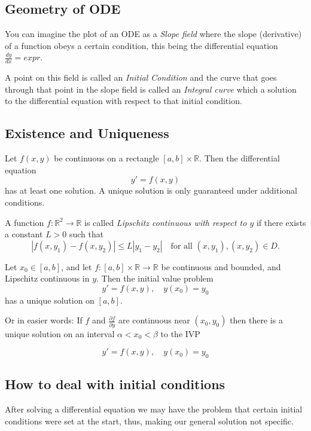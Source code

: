 \subsection{Geometry of ODE}

You can imagine the plot of an ODE as a \emph{Slope field} where the slope (derivative) of a function
obeys a certain condition, this being the differential equation \(\frac{dy}{dx} = expr\).
\vspace{\baselineskip}

A point on this field is called an \emph{Initial Condition} and the curve that goes through
that point in the slope field is called an \emph{Integral curve} which a solution to the differential
equation with respect to that initial condition.


\subsection{Existence and Uniqueness}

Let \( f(x, y) \) be continuous on a rectangle \( [a, b] \times \mathbb{R} \). Then the differential equation
\[
y' = f(x, y)
\]
has at least one solution. A unique solution is only guaranteed under additional conditions.

A function \( f : \mathbb{R}^2 \to \mathbb{R} \) is called \emph{Lipschitz continuous with respect to \( y \)} if there exists a constant \( L > 0 \) such that
\[
|f(x, y_1) - f(x, y_2)| \leq L |y_1 - y_2|
\quad \text{for all } (x, y_1), (x, y_2) \in D.
\]

Let \( x_0 \in [a, b] \), and let \( f : [a, b] \times \mathbb{R} \to \mathbb{R} \) be continuous and bounded, and Lipschitz continuous in \( y \). Then the initial value problem
\[
y' = f(x, y), \quad y(x_0) = y_0
\]
has a unique solution on \( [a, b] \).
\vspace{\baselineskip}

Or in easier words: If \(f\) and \(\frac{\partial f}{\partial y}\) are continuous near \((x_0, y_0)\) then
there is a unique solution on an interval \(\alpha < x_0 < \beta\) to the IVP

\[y' = f(x,y), \quad y(x_0) = y_0\]

\subsection{How to deal with initial conditions}

After solving a differential equation we may have the problem that certain initial
conditions were set at the start, thus, making our general solution not specific.
\vspace{\baselineskip}

